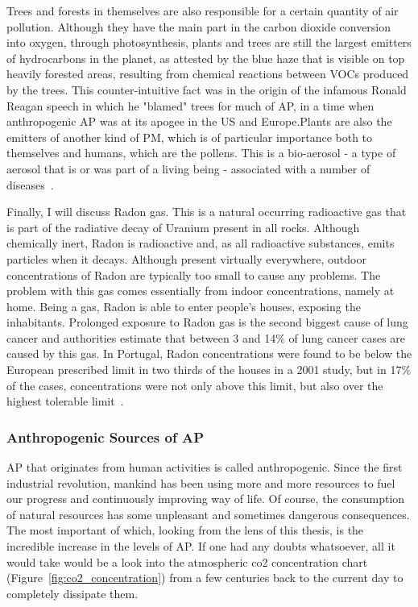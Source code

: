 Trees and forests in themselves are also responsible for a certain
quantity of air pollution. Although they have the main part in the
carbon dioxide conversion into oxygen, through photosynthesis, plants
and trees are still the largest emitters of hydrocarbons in the planet,
as attested by the blue haze that is visible on top heavily forested
areas, resulting from chemical reactions between \gls{VOC}s produced by
the trees. This counter-intuitive fact was in the origin of the infamous
Ronald Reagan speech in which he "blamed" trees for much of \gls{AP}, in
a time when anthropogenic \gls{AP} was at its apogee in the US and
Europe.Plants are also the emitters of another kind of \gls{PM}, which
is of particular importance both to themselves and humans, which are the
pollens. This is a bio-aerosol - a type of aerosol that is or was part
of a living being - associated with a number of
diseases~\cite{Vallero2014}.

Finally, I will discuss Radon gas. This is a natural occurring
radioactive gas that is part of the radiative decay of Uranium present
in all rocks. Although chemically inert, Radon is radioactive and, as
all radioactive substances, emits particles when it decays. Although
present virtually everywhere, outdoor concentrations of Radon are
typically too small to cause any problems. The problem with this gas
comes essentially from indoor concentrations, namely at home. Being a
gas, Radon is able to enter people's houses, exposing the inhabitants.
Prolonged exposure to Radon gas is the second biggest cause of lung
cancer and authorities estimate that between 3 and 14\% of lung cancer
cases are caused by this gas. In Portugal, Radon concentrations were
found to be below the European prescribed limit in two thirds of the
houses in a 2001 study, but in 17\% of the cases, concentrations were
not only above this limit, but also over the highest tolerable
limit~\cite{Vallero2014, WorldHealthOrganization2016, ProTeste2003}.


\subsubsection{Anthropogenic Sources of \acrlong{AP}}%
\label{ssub:anthropogenic_sources_of_ap}

\acrlong{AP} that originates from human activities is called
anthropogenic. Since the first industrial revolution, mankind has been
using more and more resources to fuel our progress and continuously
improving way of life. Of course, the consumption of natural resources
has some unpleasant and sometimes dangerous consequences. The most
important of which, looking from the lens of this thesis, is the
incredible increase in the levels of \gls{AP}. If one had any doubts
whatsoever, all it would take would be a look into the atmospheric
\gls{co2} concentration chart (Figure~\ref{fig:co2_concentration}) from
a few centuries back to the current day to completely dissipate them.

